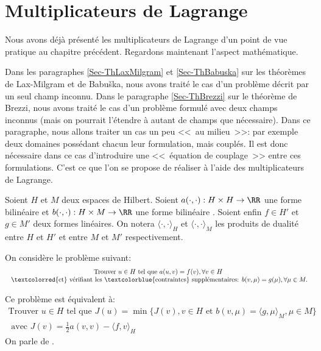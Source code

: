 \medskip



\section{Multiplicateurs de Lagrange}\label{Sec-MultLag}
Nous avons déjà présenté les multiplicateurs de Lagrange d'un point de
vue pratique au chapitre précédent.
Regardons maintenant l'aspect mathématique.

Dans les paragraphes \ref{Sec-ThLaxMilgram} et \ref{Sec-ThBabuska} sur les théorèmes de Lax-Milgram et
de Babuška, nous avons traité le cas d'un problème décrit par un seul champ inconnu.
Dans le paragraphe \ref{Sec-ThBrezzi} sur le théorème de Brezzi, nous avons traité le cas d'un problème formulé
avec deux champs inconnus (mais on pourrait l'étendre à autant de champs
que nécessaire).
Dans ce paragraphe, nous allons traiter un cas un peu <<~au milieu~>>: par exemple
deux domaines possédant chacun leur formulation, mais couplés. Il est donc
nécessaire dans ce cas d'introduire une <<~équation de couplage~>> entre ces
formulations. C'est ce que l'on se propose de réaliser à l'aide des multiplicateurs
de Lagrange.

\medskip
\begin{definition}
Soient $H$ et $M$ deux espaces de Hilbert.
Soient  $a(\cdot,\cdot): H\times H\rightarrow\RR$ une forme bilinéaire 
et  $b(\cdot,\cdot): H\times M\rightarrow\RR$ une forme bilinéaire .
Soient enfin $f\in H'$ et $g\in M'$ deux formes linéaires. On notera
$\langle\cdot,\cdot\rangle_H$ et $\langle\cdot,\cdot\rangle_M$ les produits de dualité entre $H$ et $H'$
et entre $M$ et $M'$ respectivement.

\medskip
On considère le problème suivant:
\begin{equation}
\begin{array}{c}
\text{Trouver } u\in H \text{ tel que } a(u,v)=f(v), \forall v\in H \\
\text{ \textcolorred{et} vérifiant les
\textcolorblue{contraintes} supplémentaires: } b(v,\mu)=g(\mu), \forall \mu\in M.
\end{array}
\end{equation}

\medskip
Ce problème est équivalent à:
\begin{equation}\label{Eq-Pmin}
\begin{array}{c}
\text{Trouver } u\in H \text{ tel que }
J(u)=\min\{J(v), v\in H \text{ et } b(v,\mu)=\langle g,\mu\rangle_M, \mu\in M\} \\[+3mm]
\text{ avec }
J(v)=\frac12 a(v,v)-\langle f,v\rangle_H
\end{array}
\end{equation}
On parle de .
\end{definition}

